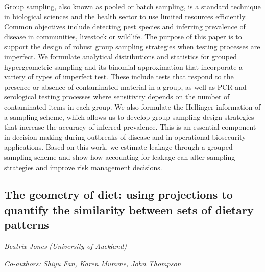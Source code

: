 \documentclass[
]{scrreprt}
\begin{document}
Group sampling, also known as pooled or batch sampling, is a standard
technique in biological sciences and the health sector to use limited
resources efficiently. Common objectives include detecting pest species
and inferring prevalence of disease in communities, livestock or
wildlife. The purpose of this paper is to support the design of robust
group sampling strategies when testing processes are imperfect. We
formulate analytical distributions and statistics for grouped
hypergeometric sampling and its binomial approximation that incorporate
a variety of types of imperfect test. These include tests that respond
to the presence or absence of contaminated material in a group, as well
as PCR and serological testing processes where sensitivity depends on
the number of contaminated items in each group. We also formulate the
Hellinger information of a sampling scheme, which allows us to develop
group sampling design strategies that increase the accuracy of inferred
prevalence. This is an essential component in decision-making during
outbreaks of disease and in operational biosecurity applications. Based
on this work, we estimate leakage through a grouped sampling scheme and
show how accounting for leakage can alter sampling strategies and
improve risk management decisions.

\subsection{The geometry of diet: using projections to quantify the
similarity between sets of dietary
patterns}\label{the-geometry-of-diet-using-projections-to-quantify-the-similarity-between-sets-of-dietary-patterns}

\emph{Beatrix Jones} \emph{(University of
Auckland)}

\emph{Co-authors: Shiyu Fan, Karen Mumme, John Thompson}

\setlength{\parskip}{0.5em}
\end{document}
